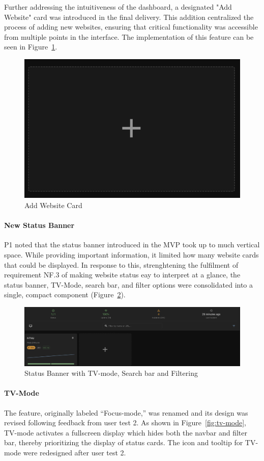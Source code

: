 Further addressing the intuitiveness of the dashboard, a designated "Add Website" card was introduced in the final delivery. This addition centralized the process of adding new websites, ensuring that critical functionality was accessible from multiple points in the interface. The implementation of this feature can be seen in Figure~\ref{fig:addwebsitecard}.

\begin{figure}[H]
    \centering
    \includegraphics[width=0.5\linewidth]{figures/addwebsitecard.png}
    \caption{Add Website Card}
    \label{fig:addwebsitecard}
\end{figure}

\paragraph{New Status Banner}
P1 noted that the status banner introduced in the MVP took up to much vertical space. While providing important information, it limited how many website cards that could be displayed. In response to this,  strenghtening the fulfilment of requirement NF.3 of making website status eay to interpret at a glance, the status banner, TV-Mode, search bar, and filter options were consolidated into a single, compact component (Figure~\ref{fig:statusbar}). 

\begin{figure}[H]
    \centering
    \includegraphics[width=1\linewidth]{figures/statusbar.png}
    \caption{Status Banner with TV-mode, Search bar and Filtering}
    \label{fig:statusbar}
\end{figure}


\paragraph{TV-Mode}
The feature, originally labeled “Focus-mode,” was renamed and its design was revised following feedback from user test 2. As shown in Figure~\ref{fig:tv-mode}, TV-mode activates a fullscreen display which hides both the navbar and filter bar, thereby prioritizing the display of status cards. The icon and tooltip for TV-mode were redesigned after user test 2.



